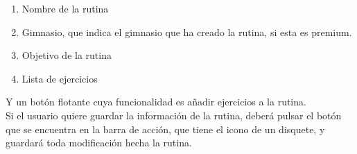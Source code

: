 \documentclass[11pt,a4paper]{report}
\begin{document}
\begin{enumerate}
	\item Nombre de la rutina

	\item Gimnasio, que indica el gimnasio que ha creado la rutina, si esta es premium.

	\item Objetivo de la rutina

	\item Lista de ejercicios

\end{enumerate}
Y un botón flotante cuya funcionalidad es añadir ejercicios a la rutina.
\\Si el usuario quiere guardar la información de la rutina, deberá pulsar el botón que se encuentra en la barra de acción, que tiene el icono de un disquete, y guardará toda modificación hecha la rutina.
\end{document}
